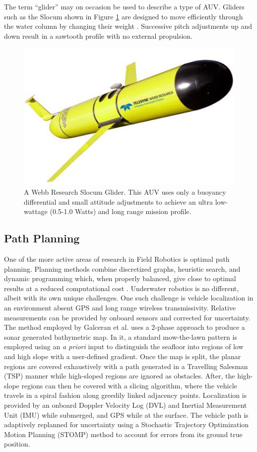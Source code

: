 \documentclass[double,12pt]{beavtex}
\begin{document}
The term ``glider'' may on occasion be used to describe a type of AUV. Gliders such as the Slocum shown in Figure \ref{fig:slocum} are designed to move efficiently through the water column by changing their weight \cite{bachmayer}. Successive pitch adjustments up and down result in a sawtooth profile with no external propulsion.

\begin{figure}[h!]
\begin{center}
\includegraphics[width=0.5\columnwidth]{slocum}
\caption{A Webb Research Slocum Glider. This AUV uses only a buoyancy differential and small attitude adjustments to achieve an ultra low-wattage (0.5-1.0 Watts) and long range mission profile.}
\label{fig:slocum}
\end{center}
\end{figure}

\subsection{Path Planning}
One of the more active areas of research in Field Robotics is optimal path planning. Planning methods combine discretized graphs, heuristic search, and dynamic programming which, when properly balanced, give close to optimal results at a reduced computational cost \cite{lavalle}. Underwater robotics is no different, albeit with its own unique challenges. One such challenge is vehicle localization in an environment absent GPS and long range wireless transmissivity. Relative measurements can be provided by onboard sensors and corrected for uncertainty. The method employed by Galceran et al. \cite{galceran} uses a 2-phase approach to produce a sonar generated bathymetric map. In it, a standard mow-the-lawn pattern is employed using an \textit{a priori} input to distinguish the seafloor into regions of low and high slope with a user-defined gradient. Once the map is split, the planar regions are covered exhaustively with a path generated in a Travelling Salesman (TSP) manner while high-sloped regions are ignored as obstacles. After, the high-slope regions can then be covered with a slicing algorithm, where the vehicle travels in a spiral fashion along greedily linked adjacency points. Localization is provided by an onboard Doppler Velocity Log (DVL) and Inertial Measurement Unit (IMU) while submerged, and GPS while at the surface. The vehicle path is adaptively replanned for uncertainty using a Stochastic Trajectory Optimization Motion Planning (STOMP) method to account for errors from its ground true position.
\end{document}
